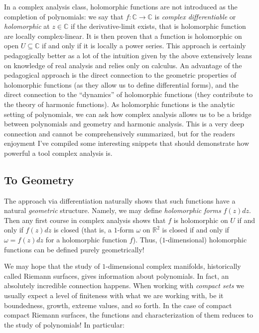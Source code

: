 \documentclass[oneside]{article}
\newcommand{\C}{\mathbb{C}}
\newcommand{\R}{\mathbb{R}}
\newcommand{\sse}{\subseteq}
\begin{document}
In a complex analysis class, holomorphic functions are not introduced as the completion of polynomials: we say
that $f: \C \to \C$ is \emph{complex differentiable} or \emph{holomorphic} at $z \in \C$ if the
derivative-limit exists, that is holomorphic function are locally complex-linear. It is then
proven that a function is holomorphic on open $U \sse \C$ if and only if it is locally a power series. This
approach is certainly pedagogically better as a lot of the intuition given by the above extensively leans on
knowledge of real analysis and relies only on calculus. An advantage of the pedagogical approach is the direct
connection to the geometric properties of holomorphic functions (as they allow us to define differential forms),
and the direct connection to the ``dynamics'' of holomorphic functions (they contribute to the theory of
harmonic functions). As holomorphic functions is the analytic setting of polynomials, we can ask how complex
analysis allows us to be a bridge between polynomials and geometry and harmonic analysis. This is a very deep
connection and cannot be comprehensively summarized, but for the readers enjoyment I've compiled some
interesting snippets that should demonstrate how powerful a tool complex analysis is.


\subsection{To Geometry}



The approach via differentiation naturally shows that such functions have a
natural \emph{geometric} structure. Namely, we may define \emph{holomorphic forms} $f(z)dz$. Then any first
course in complex analysis shows that $f$ is holomorphic on $U$ if and only if $f(z)dz$ is closed (that is, a
$1$-form $\omega$ on $\R^2$ is closed if and only if $\omega = f(z)dz$ for a holomorphic function $f$). Thus,
($1$-dimensional) holomorphic functions can be defined purely geometrically!

We may hope that the study of $1$-dimensional complex manifolds, historically called Riemann surfaces, gives information
about polynomials. In fact, an absolutely incredible connection happens. When working with
\emph{compact sets} we usually expect a level of finiteness with what we are working with, be it boundedness,
growth, extreme values, and so forth. In the case of compact compact Riemann surfaces, the functions and
characterization of them reduces to the study of polynomials! In particular:
\end{document}
